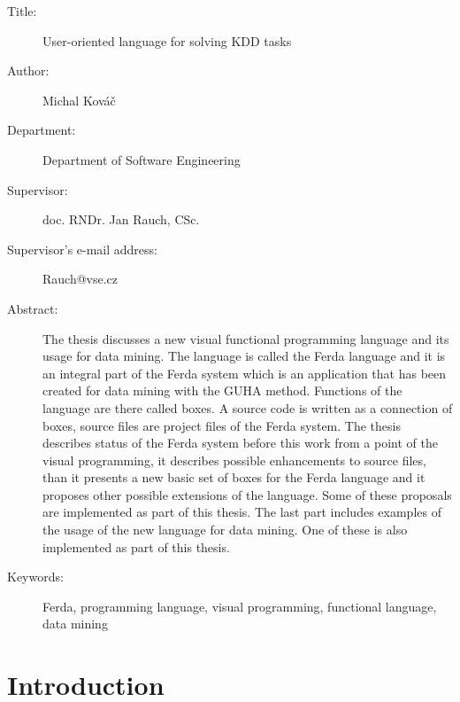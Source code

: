 \documentclass[a4paper,12pt]{book}
\begin{document}
{\begin{description}
 \item [Title:] User-oriented language for solving KDD tasks
 \item [Author:] Michal Kováč
 \item [Department:] Department of Software Engineering
 \item [Supervisor:] doc. RNDr. Jan Rauch, CSc.
 \item [Supervisor's e-mail address:] Rauch@vse.cz
 \item [Abstract:] The thesis discusses a new visual functional programming language and its usage for data mining. The language is called the Ferda language and it is an integral part of the Ferda system which is an application that has been created for data mining with the GUHA method. Functions of the language are there called boxes. A source code is written as a connection of boxes, source files are project files of the Ferda system. The thesis describes status of the Ferda system before this work from a point of the visual programming, it describes possible enhancements to source files, than it presents a new basic set of boxes for the Ferda language and it proposes other possible extensions of the language. Some of these proposals are implemented as part of this thesis. The last part includes examples of the usage of the new language for data mining. One of these is also implemented as part of this thesis.

 \item [Keywords:] Ferda, programming language, visual programming, functional language, data mining
\end{description}
}

\chapter{Introduction}
\end{document}
